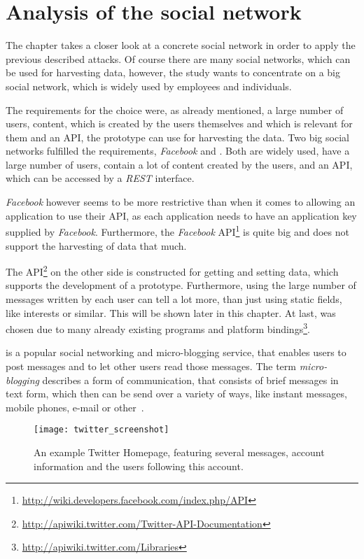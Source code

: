 \chapter{Analysis of the social network \Twitter}
\label{chap:analysis}

The chapter takes a closer look at a concrete social network in order to
apply the previous described attacks. Of course there are many social
networks, which can be used for harvesting data, however, the study wants to
concentrate on a big social network, which is widely used by employees and
individuals.

The requirements for the choice were, as already mentioned, a large number of
users, content, which is created by the users themselves and which is
relevant for them and an API, the prototype can use for harvesting the data.
Two big social networks fulfilled the requirements, \textit{Facebook} and \Twitter. Both are
widely used, have a large number of users, contain a lot of content created by the
users, and an API, which can be accessed by a \textit{REST} interface.

\textit{Facebook} however seems to be more restrictive than \Twitter{} when it
comes to allowing an application to use their API, as each application needs to
have an application key supplied by \textit{Facebook}. Furthermore, the
\textit{Facebook}
API\footnote{\url{http://wiki.developers.facebook.com/index.php/API}} is quite
big and does not support the harvesting of data that much.

The \Twitter{}
API\footnote{\url{http://apiwiki.twitter.com/Twitter-API-Documentation}} on the
other side is constructed for getting and setting data, which supports the
development of a prototype. Furthermore, using the large number of messages
written by each \Twitter{} user can tell a lot more, than just using static
fields, like interests or similar. This will be shown later in this chapter.
At last, \Twitter{} was chosen due to many already existing programs and
platform bindings\footnote{\url{http://apiwiki.twitter.com/Libraries}}.

\Twitter{} is a popular social networking and micro-blogging service, that
enables users to post messages and to let other users read those messages.
The term \textit{micro-blogging} describes a form of communication, that
consists of brief messages in text form, which then can be send over a variety
of ways, like instant messages, mobile phones, e-mail or other~\cite{java2007}.

\begin{figure}[hbt]
  \centering
  \texttt{[image: twitter\_screenshot]}
  \caption{An example Twitter Homepage, featuring several \Twitter{}
  messages, account information and the users following this account.}
  \label{fig:twitter_screenshot}
\end{figure}

